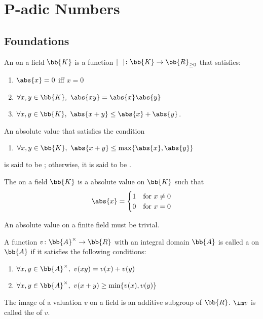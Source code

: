\section{P-adic Numbers}\cite{gouvea}
\subsection{Foundations}
An  on a field $\bb{K}$ is a function $\mid \ \ \mid \colon \bb{K} \to \bb{R}_{\ge0}$ that satisfies:
\begin{enumerate}
\item $\abs{x} = 0$ iff $x = 0$
\item $\forall x, y \in \bb{K},\ \abs{xy} = \abs{x}\abs{y}$
\item $\forall x, y \in \bb{K},\ \abs{x+y} \le \abs{x}+\abs{y}$.
\end{enumerate}

An absolute value that satisfies the condition
\begin{enumerate}[resume*]
\item $\forall x, y \in \bb{K},\ \abs{x+y} \le \max \{ \abs{x},\abs{y} \}$
\end{enumerate}
is said to be ; otherwise, it is said to be .

The  on a field $\bb{K}$ is a absolute value on $\bb{K}$ such that
\[
\abs{x} = \begin{cases}
 1 & \text{for}\ x \neq 0 \\
 0 & \text{for}\ x = 0
 \end{cases}
\]

An absolute value on a finite field must be trivial.

A function $v \colon \bb{A}^\times \to \bb{R}$ with an integral domain $\bb{A}$ is called a  on $\bb{A}$ if it satisfies the following conditions:
\begin{enumerate}
\item $\forall x, y \in \bb{A}^\times,\ v(xy) = v(x) + v(y)$
\item $\forall x, y \in \bb{A}^\times,\ v(x+y) \ge \min \{ v(x), v(y) \}$
\end{enumerate}

The image of a valuation $v$ on a field is an additive subgroup of $\bb{R}$. $\im v$ is called the  of $v$.


